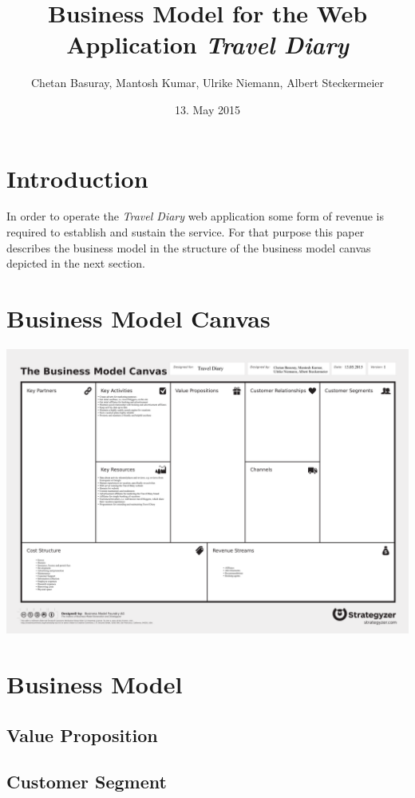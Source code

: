 \documentclass[IN,english]{tumbook}
\title{Business Model for the Web Application \emph{Travel Diary}}
\author{Chetan Basuray, Mantosh Kumar, Ulrike Niemann, Albert Steckermeier}
\date{13. May 2015}
\begin{document}
\maketitle
\newpage
\tableofcontents
\newpage

\chapter{Introduction}

In order to operate the \emph{Travel Diary} web application some form of revenue is required to establish and sustain the service. For that purpose this paper describes the business model in the structure of the business model canvas depicted in the next section.

\chapter{Business Model Canvas}

\begin{center}
	\includegraphics[scale=0.17, angle=90]{graphics/team-39-exercise-2-business-model-canvas}
\end{center}

\chapter{Business Model}

\section{Value Proposition}

\section{Customer Segment}
\end{document}
